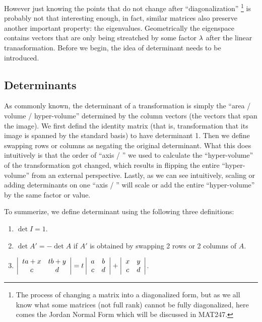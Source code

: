 \documentclass[11pt, cyan, night, 1in]{LatexTemplate/hw}
\begin{document}
However just knowing the points that do not change after ``diagonalization'' \footnote{The process of changing a matrix into a diagonalized form, but as we all know what some matrices (not full rank) cannot be fully diagonalized, here comes the Jordan Normal Form which will be discussed in MAT247.} is probably not that interesting enough, in fact, similar matrices also preserve another important property: the eigenvalues. Geometrically the eigenspace contains vectors that are only being streatched by some factor $\lambda$ after the linear tranasformation. Before we begin, the idea of determinant needs to be introduced.

\subsection{Determinants}

As commonly known, the determinant of a transformation is simply the ``area / volume / hyper-volume'' determined by the column vectors (the vectors that span the image). We first defind the identity matrix (that is, transformation that its image is spanned by the standard basis) to have determinant 1. Then we define swapping rows or columns as negating the original determinant. What this does intuitively is that the order of ``axis / '' we used to calculate the ``hyper-volume'' of the transformation got changed, which results in flipping the entire ``hyper-volume'' from an external perspective. Lastly, as we can see intuitively, scaling or adding determinants on one ``axis / '' will scale or add the entire ``hyper-volume'' by the same factor or value.

To summerize, we define determinant using the following three definitions:
\begin{enumerate}
    \item $\det I = 1$.
    \item $\det A' = - \det A$ if $A'$ is obtained by swapping 2 rows or 2 columns of $A$.
    \item $\left|\begin{array}{cc}
        ta+x & tb+y\\
        c & d
    \end{array}\right| = t\left|\begin{array}{cc}
        a & b\\
        c & d
    \end{array}\right| + \left|\begin{array}{cc}
        x & y\\
        c & d
    \end{array}\right|$.
\end{enumerate}
\end{document}
